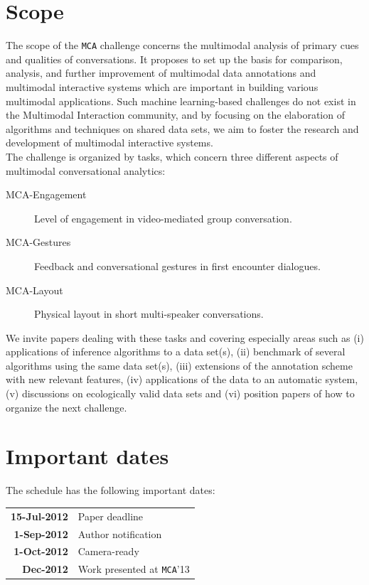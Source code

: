 \documentclass[a4paper]{article}
\begin{document}
\section*{Scope}
The scope of the \texttt{MCA} challenge concerns the multimodal analysis of primary cues and qualities of conversations.
It proposes to set up the basis for comparison, analysis, and further improvement of multimodal data annotations and
multimodal interactive systems which are important in building various multimodal applications. Such machine
learning-based challenges do not exist in the Multimodal Interaction community, and by focusing on the elaboration of
algorithms and techniques on shared data sets, we aim to foster the research and development of multimodal interactive
systems.\\
The challenge is organized by tasks, which concern three different aspects of multimodal conversational analytics:
\begin{description}
\item[MCA-Engagement] Level of engagement in video-mediated group conversation.
\item[MCA-Gestures] Feedback and conversational gestures in first encounter dialogues.
\item[MCA-Layout] Physical layout in short multi-speaker conversations.
\end{description}
We invite papers dealing with these tasks and covering especially areas such as (i) applications of inference algorithms
to a data set(s), (ii) benchmark of several algorithms using the same data set(s), (iii) extensions of the annotation
scheme with new relevant features, (iv) applications of the data to an automatic system, (v) discussions on ecologically
valid data sets and (vi) position papers of how to organize the next challenge.

\section*{Important dates}
The schedule has the following important dates:
\begin{center}
\begin{tabular}{rl}
 \textbf{15-Jul-2012} & Paper deadline \vspace{0.1cm}\\
 \textbf{1-Sep-2012} & Author notification \vspace{0.1cm}\\
 \textbf{1-Oct-2012} & Camera-ready \vspace{0.1cm}\\
 \textbf{Dec-2012} & Work presented at \texttt{MCA}'13 \vspace{0.1cm}\\
\end{tabular}
\end{center}
\end{document}

